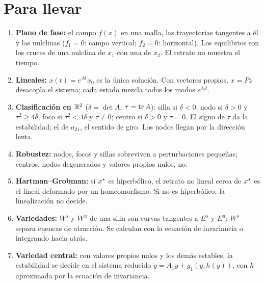 \section{Para llevar}
\label{sec:bi-cierre}

\begin{parallevar}
\begin{enumerate}
  \item \textbf{Plano de fase:} el campo $f(x)$ en una malla, las trayectorias tangentes a él y las nulclinas ($f_1=0$: campo vertical; $f_2=0$: horizontal). Los equilibrios son los cruces de una nulclina de $x_1$ con una de $x_2$. El retrato no muestra el tiempo.
  \item \textbf{Lineales:} $x(t)=e^{At}x_0$ es la única solución. Con vectores propios, $x=Pz$ desacopla el sistema; cada estado mezcla todos los modos $e^{\lambda_it}$.
  \item \textbf{Clasificación en $\mathbb{R}^2$} ($\delta=\det A$, $\tau=\operatorname{tr} A$): silla si $\delta<0$; nodo si $\delta>0$ y $\tau^2\ge4\delta$; foco si $\tau^2<4\delta$ y $\tau\neq0$; centro si $\delta>0$ y $\tau=0$. El signo de $\tau$ da la estabilidad; el de $a_{21}$, el sentido de giro. Los nodos llegan por la dirección lenta.
  \item \textbf{Robustez:} nodos, focos y sillas sobreviven a perturbaciones pequeñas; centros, nodos degenerados y valores propios nulos, no.
  \item \textbf{Hartman--Grobman:} si $x^{*}$ es hiperbólico, el retrato no lineal cerca de $x^{*}$ es el lineal deformado por un homeomorfismo. Si no es hiperbólico, la linealización no decide.
  \item \textbf{Variedades:} $W^s$ y $W^u$ de una silla son curvas tangentes a $E^s$ y $E^u$; $W^s$ separa cuencas de atracción. Se calculan con la ecuación de invariancia o integrando hacia atrás.
  \item \textbf{Variedad central:} con valores propios nulos y los demás estables, la estabilidad se decide en el sistema reducido $\dot y=A_1y+g_1(y,h(y))$, con $h$ aproximada por la ecuación de invariancia.
\end{enumerate}
\end{parallevar}

